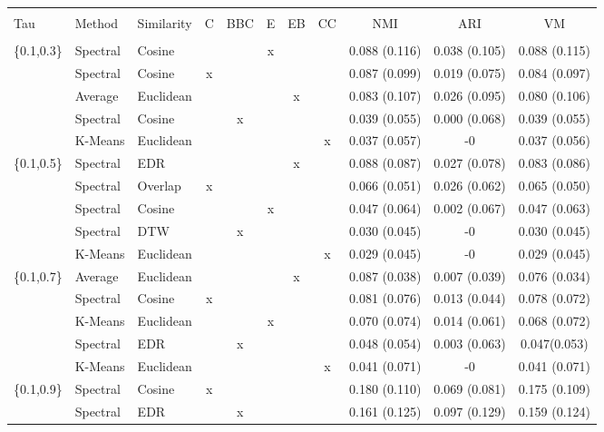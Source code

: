 \documentclass[12pt,a4paper,bibliography=totocnumbered,listof=totocnumbered]{scrartcl}
\begin{document}
{\begin{appendix}
\begin{table}[H] \centering 
	\label{} 
	\scriptsize
	\begin{tabularx}{\textwidth}{ lllcccccccc} \\
		\\[-1.8ex]	\toprule
		\\[-1.8ex] 
Tau & Method & Similarity & C & BBC & E & EB & CC & NMI & ARI & VM \\ 
\hline \\[-1.8ex] 
\{0.1,0.3\} & Spectral & Cosine &  &  & x &  &  & 0.088 (0.116) & 0.038 (0.105) & 0.088 (0.115) \\ 
& Spectral & Cosine & x &  &  &  &  & 0.087 (0.099) & 0.019 (0.075) & 0.084 (0.097) \\ 
& Average & Euclidean &  &  &  & x &  & 0.083 (0.107) & 0.026 (0.095) & 0.080 (0.106) \\ 
& Spectral & Cosine &  & x &  &  &  & 0.039 (0.055) & 0.000 (0.068) & 0.039 (0.055) \\ 
& K-Means & Euclidean &  &  &  &  & x & 0.037 (0.057) & -0 & 0.037 (0.056) \\ 
\{0.1,0.5\} & Spectral & EDR &  &  &  & x &  & 0.088 (0.087) & 0.027 (0.078) & 0.083 (0.086) \\ 
& Spectral & Overlap & x &  &  &  &  & 0.066 (0.051) & 0.026 (0.062) & 0.065 (0.050) \\ 
& Spectral & Cosine &  &  & x &  &  & 0.047 (0.064) & 0.002 (0.067) & 0.047 (0.063) \\ 
& Spectral & DTW &  & x &  &  &  & 0.030 (0.045) & -0 & 0.030 (0.045) \\ 
& K-Means & Euclidean &  &  &  &  & x & 0.029 (0.045) & -0 & 0.029 (0.045) \\ 
\{0.1,0.7\} & Average & Euclidean &  &  &  & x &  & 0.087 (0.038) & 0.007 (0.039) & 0.076 (0.034) \\ 
& Spectral & Cosine & x &  &  &  &  & 0.081 (0.076) & 0.013 (0.044) & 0.078 (0.072) \\ 
& K-Means & Euclidean &  &  & x &  &  & 0.070 (0.074) & 0.014 (0.061) & 0.068 (0.072) \\ 
& Spectral & EDR &  & x &  &  &  & 0.048 (0.054) & 0.003 (0.063) & 0.047(0.053) \\ 
& K-Means & Euclidean &  &  &  &  & x & 0.041 (0.071) & -0 & 0.041 (0.071) \\ 
\{0.1,0.9\} & Spectral & Cosine & x &  &  &  &  & 0.180 (0.110) & 0.069 (0.081) & 0.175 (0.109) \\ 
& Spectral & EDR &  & x &  &  &  & 0.161 (0.125) & 0.097 (0.129) & 0.159 (0.124) \\ 

\end{tabularx}
\end{table}
\end{appendix}}
\end{document}

